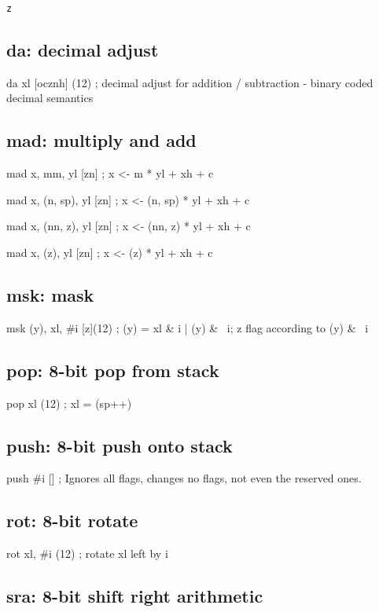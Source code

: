 \documentclass{book}
\begin{document}
\texttt{z}


\subsection{da: decimal adjust}

da xl [ocznh] (12)        ; decimal adjust for addition / subtraction - binary coded decimal semantics


\subsection{mad: multiply and add}

mad x, mm, yl [zn]        ; x <- m * yl + xh + c

mad x, (n, sp), yl [zn]   ; x <- (n, sp) * yl + xh + c

mad x, (nn, z), yl [zn]   ; x <- (nn, z) * yl + xh + c

mad x, (z), yl [zn]       ; x <- (z) * yl + xh + c


\subsection{msk: mask}

msk (y), xl, \#i [z](12)   ; (y) = xl \& i | (y) \& ~i; z flag according to (y) \& ~i


\subsection{pop: 8-bit pop from stack}

pop xl (12)               ; xl = (sp++)


\subsection{push: 8-bit push onto stack}

push \#i []                ; Ignores all flags, changes no flags, not even the reserved ones.


\subsection{rot: 8-bit rotate}

rot xl, \#i (12)           ; rotate xl left by i


\subsection{sra: 8-bit shift right arithmetic}
\end{document}
